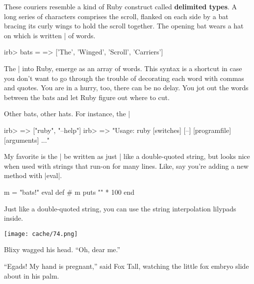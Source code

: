 \documentclass[12pt,twoside]{report}
\begin{document}
These couriers resemble a kind of Ruby construct called {\bf delimited
  types}.  A long series of characters comprises the scroll, flanked
on each side by a bat bracing its curly wings to hold the scroll
together. The opening bat wears a hat on which is written
\rubyinline|%
of words.


\begin{consolecode}

 irb> bats = %
   => ['The', 'Winged', 'Scroll', 'Carriers']

\end{consolecode}


The \rubyinline|%
into Ruby, emerge as an array of words.  This syntax is a shortcut in
case you don't want to go through the trouble of decorating each word
with commas and quotes.  You are in a hurry, too, there can be no
delay.  You jot out the words between the bats and let Ruby figure out
where to cut.

Other bats, other hats.  For instance, the
\rubyinline|%


\begin{consolecode}

 irb> %
   => ["ruby", "--help"]
 irb> %
   => "Usage: ruby [switches] [--] [programfile] [arguments] ..."

\end{consolecode}


My favorite is the \rubyinline|%
be written as just \rubyinline|%
like a double-quoted string, but looks nice when used with strings
that run-on for many lines.  Like, say you're adding a new method with
\rubyinline|eval|.


\begin{consolecode}

 m = "bats!"
 eval %
   def #{ m }
     puts "{" * 100
   end
 }

\end{consolecode}


Just like a double-quoted string, you can use the string interpolation
lilypads inside.

	\texttt{[image: cache/74.png]}

Blixy wagged his head.  ``Oh, dear me.''

``Egads! My hand is pregnant,'' said Fox Tall, watching the little fox
embryo slide about in his palm.
\end{document}
